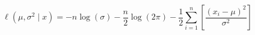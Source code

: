 \begin{equation}
    \ell
	\left(
	\mu,
	\sigma^2
	\mid
	x
	\right)
	=
	-
	n
	\log
	\left(
	\sigma
	\right)
	-
	\frac{
	n
	}{
	2
	}
	\log
	\left(
	2
	\pi
	\right)
	-
	\frac{1}{2}
	\sum_{i = 1}^{n}
	\left[
	\frac{
		\left( 
		x_i 
		- 
		\mu 
		\right)^2
	}
	{
		\sigma^2
	}
	\right]
	\label{eq:multiNorm-n-loglikelihood}
\end{equation}